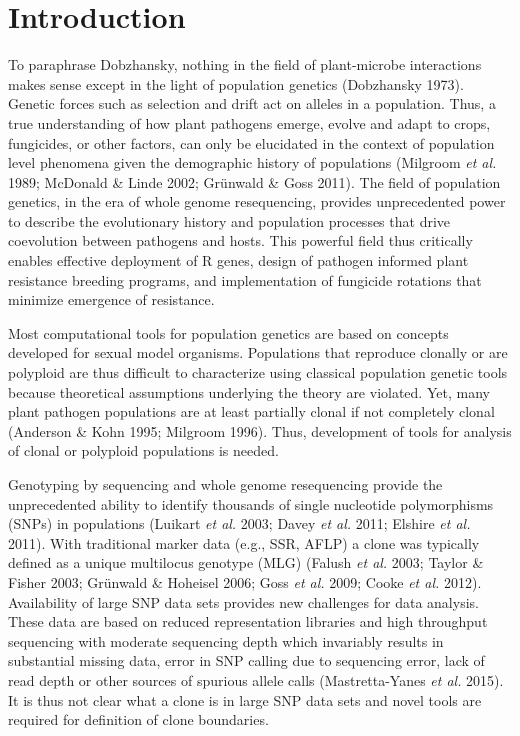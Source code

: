 \documentclass[double,12pt]{beavtex}
\begin{document}
  \section{Introduction}\label{introduction-1}
  
  To paraphrase Dobzhansky, nothing in the field of plant-microbe
  interactions makes sense except in the light of population genetics
  (Dobzhansky 1973). Genetic forces such as selection and drift act on
  alleles in a population. Thus, a true understanding of how plant
  pathogens emerge, evolve and adapt to crops, fungicides, or other
  factors, can only be elucidated in the context of population level
  phenomena given the demographic history of populations (Milgroom
  \emph{et al.} 1989; McDonald \& Linde 2002; Grünwald \& Goss 2011). The
  field of population genetics, in the era of whole genome resequencing,
  provides unprecedented power to describe the evolutionary history and
  population processes that drive coevolution between pathogens and hosts.
  This powerful field thus critically enables effective deployment of R
  genes, design of pathogen informed plant resistance breeding programs,
  and implementation of fungicide rotations that minimize emergence of
  resistance.
  
  Most computational tools for population genetics are based on concepts
  developed for sexual model organisms. Populations that reproduce
  clonally or are polyploid are thus difficult to characterize using
  classical population genetic tools because theoretical assumptions
  underlying the theory are violated. Yet, many plant pathogen populations
  are at least partially clonal if not completely clonal (Anderson \& Kohn
  1995; Milgroom 1996). Thus, development of tools for analysis of clonal
  or polyploid populations is needed.
  
  Genotyping by sequencing and whole genome resequencing provide the
  unprecedented ability to identify thousands of single nucleotide
  polymorphisms (SNPs) in populations (Luikart \emph{et al.} 2003; Davey
  \emph{et al.} 2011; Elshire \emph{et al.} 2011). With traditional marker
  data (e.g., SSR, AFLP) a clone was typically defined as a unique
  multilocus genotype (MLG) (Falush \emph{et al.} 2003; Taylor \& Fisher
  2003; Grünwald \& Hoheisel 2006; Goss \emph{et al.} 2009; Cooke \emph{et
  al.} 2012). Availability of large SNP data sets provides new challenges
  for data analysis. These data are based on reduced representation
  libraries and high throughput sequencing with moderate sequencing depth
  which invariably results in substantial missing data, error in SNP
  calling due to sequencing error, lack of read depth or other sources of
  spurious allele calls (Mastretta-Yanes \emph{et al.} 2015). It is thus
  not clear what a clone is in large SNP data sets and novel tools are
  required for definition of clone boundaries.
  
\end{document}
